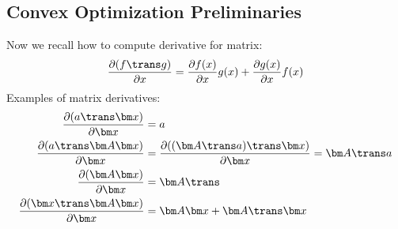 \subsection{Convex Optimization Preliminaries}
Now we recall how to compute derivative for matrix:
\[
\frac{\partial(f\trans g)}{\partial x}=\frac{\partial f(x)}{\partial x}g(x)+\frac{\partial g(x)}{\partial x}f(x)
\]
Examples of matrix derivatives:
\begin{align*}
\frac{\partial(a\trans \bm x)}{\partial \bm x}&=a
\\
\frac{\partial(a\trans \bm A\bm x)}{\partial \bm x}&=\frac{\partial((\bm A\trans a)\trans\bm x)}{\partial \bm x}=\bm A\trans a\\
\frac{\partial(\bm A\bm x)}{\partial \bm x}&=\bm A\trans\\
\frac{\partial(\bm x\trans\bm A\bm x)}{\partial \bm x}&=\bm A\bm x+\bm A\trans\bm x
\end{align*}
